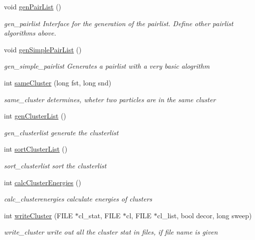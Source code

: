 \begin{DoxyCompactItemize}
void \hyperlink{class_updater_a90bd68d2d4c95f85a2d12513ab58e372}{gen\+Pair\+List} ()
\begin{DoxyCompactList}\small\item\em gen\+\_\+pairlist Interface for the generation of the pairlist. Define other pairlist algorithms above. \end{DoxyCompactList}\item 
void \hyperlink{class_updater_aafd478a2cfabeb9dbba989ad04078f0b}{gen\+Simple\+Pair\+List} ()
\begin{DoxyCompactList}\small\item\em gen\+\_\+simple\+\_\+pairlist Generates a pairlist with a very basic alogrithm \end{DoxyCompactList}\item 
int \hyperlink{class_updater_ad42b0e63d199cfe5b4b04057402a19db}{same\+Cluster} (long fst, long snd)
\begin{DoxyCompactList}\small\item\em same\+\_\+cluster determines, wheter two particles are in the same cluster \end{DoxyCompactList}\item 
int \hyperlink{class_updater_ae9ae345ec1142e8ab230b7bce00b741f}{gen\+Cluster\+List} ()
\begin{DoxyCompactList}\small\item\em gen\+\_\+clusterlist generate the clusterlist \end{DoxyCompactList}\item 
int \hyperlink{class_updater_a44ff7280e48fdf39518a5828af3cfd2a}{sort\+Cluster\+List} ()
\begin{DoxyCompactList}\small\item\em sort\+\_\+clusterlist sort the clusterlist \end{DoxyCompactList}\item 
int \hyperlink{class_updater_addde9aa367c4f364b263b8fdda9345b8}{calc\+Cluster\+Energies} ()
\begin{DoxyCompactList}\small\item\em calc\+\_\+clusterenergies calculate energies of clusters \end{DoxyCompactList}\item 
int \hyperlink{class_updater_ad3395745c795331dbc976d209d7a1ece}{write\+Cluster} (F\+I\+L\+E $\ast$cl\+\_\+stat, F\+I\+L\+E $\ast$cl, F\+I\+L\+E $\ast$cl\+\_\+list, bool decor, long sweep)
\begin{DoxyCompactList}\small\item\em write\+\_\+cluster write out all the cluster stat in files, if file name is given \end{DoxyCompactList}\end{DoxyCompactItemize}

